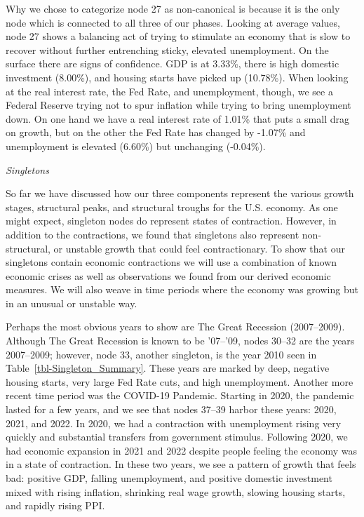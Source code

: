 \documentclass[
  10pt,
  letterpaper,
  DIV=11,
  numbers=noendperiod]{scrartcl}
\begin{document}
Why we chose to categorize node 27 as non-canonical is because it is the
only node which is connected to all three of our phases. Looking at
average values, node 27 shows a balancing act of trying to stimulate an
economy that is slow to recover without further entrenching sticky,
elevated unemployment. On the surface there are signs of confidence. GDP
is at 3.33\%, there is high domestic investment (8.00\%), and housing
starts have picked up (10.78\%). When looking at the real interest rate,
the Fed Rate, and unemployment, though, we see a Federal Reserve trying
not to spur inflation while trying to bring unemployment down. On one
hand we have a real interest rate of 1.01\% that puts a small drag on
growth, but on the other the Fed Rate has changed by -1.07\% and
unemployment is elevated (6.60\%) but unchanging (-0.04\%).

\emph{Singletons}

So far we have discussed how our three components represent the various
growth stages, structural peaks, and structural troughs for the U.S.
economy. As one might expect, singleton nodes do represent states of
contraction. However, in addition to the contractions, we found that
singletons also represent non-structural, or unstable growth that could
feel contractionary. To show that our singletons contain economic
contractions we will use a combination of known economic crises as well
as observations we found from our derived economic measures. We will
also weave in time periods where the economy was growing but in an
unusual or unstable way.

Perhaps the most obvious years to show are The Great Recession
(2007--2009). Although The Great Recession is known to be '07--'09,
nodes 30--32 are the years 2007--2009; however, node 33, another
singleton, is the year 2010 seen in Table~\ref{tbl-Singleton_Summary}.
These years are marked by deep, negative housing starts, very large Fed
Rate cuts, and high unemployment. Another more recent time period was
the COVID-19 Pandemic. Starting in 2020, the pandemic lasted for a few
years, and we see that nodes 37--39 harbor these years: 2020, 2021, and
2022. In 2020, we had a contraction with unemployment rising very
quickly and substantial transfers from government stimulus. Following
2020, we had economic expansion in 2021 and 2022 despite people feeling
the economy was in a state of contraction. In these two years, we see a
pattern of growth that feels bad: positive GDP, falling unemployment,
and positive domestic investment mixed with rising inflation, shrinking
real wage growth, slowing housing starts, and rapidly rising PPI.
\end{document}
